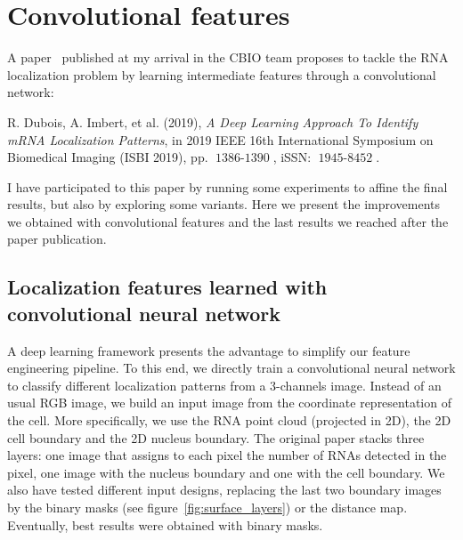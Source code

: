 
\graphicspath{{../../figures/appendix/}}

\chapter{Convolutional features} \label{ch:convolutional_features}

\newpage

A paper~\cite{dubois_deep_2019} published at my arrival in the CBIO team proposes to tackle the \ac{RNA} localization problem by learning intermediate features through a convolutional network:

\begin{center}
	\color{green}
	R. Dubois, A. Imbert, et al. (2019), \textit{A Deep Learning Approach To Identify mRNA Localization Patterns}, in 2019 IEEE 16th International Symposium on Biomedical Imaging (ISBI 2019), pp. $\operatorname{1386-1390}$, iSSN: $\operatorname{1945-8452}$.
\end{center}

\noindent
I have participated to this paper by running some experiments to affine the final results, but also by exploring some variants.
Here we present the improvements we obtained with convolutional features and the last results we reached after the paper publication.

\section{Localization features learned with convolutional neural network} \label{sec:learn_cnn_features}

A deep learning framework presents the advantage to simplify our feature engineering pipeline.
To this end, we directly train a convolutional neural network to classify different localization patterns from a 3-channels image.
Instead of an usual RGB image, we build an input image from the coordinate representation of the cell.
More specifically, we use the \ac{RNA} point cloud (projected in 2D), the 2D cell boundary and the 2D nucleus boundary.
The original paper stacks three layers: one image that assigns to each pixel the number of \ac{RNA}s detected in the pixel, one image with the nucleus boundary and one with the cell boundary.
We also have tested different input designs, replacing the last two boundary images by the binary masks (see figure~\ref{fig:surface_layers}) or the distance map.
Eventually, best results were obtained with binary masks.

